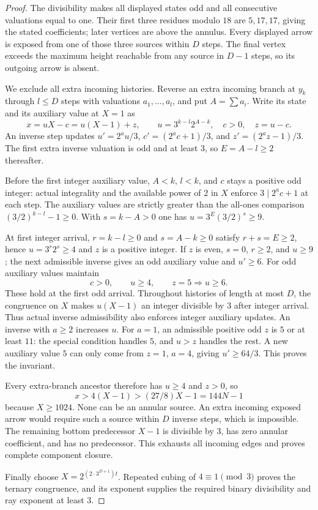 \documentclass[11pt]{article}
\begin{document}
\begin{proof}
The divisibility makes all displayed states odd and all consecutive
valuations equal to one. Their first three residues modulo $18$ are
$5,17,17$, giving the stated coefficients; later vertices are above
the annulus. Every displayed arrow is exposed from one of those three
sources within $D$ steps. The final vertex exceeds the maximum height
reachable from any source in $D-1$ steps, so its outgoing arrow is absent.

We exclude all extra incoming histories. Reverse an extra incoming branch
at $y_k$ through $l\le D$ steps with valuations $a_1,\ldots,a_l$, and put
$A=\sum a_i$. Write its state and its auxiliary value at $X=1$ as
\[
 x=uX-c=u(X-1)+z,\qquad
 u=3^{k-l}2^{A-k},\quad c>0,\quad z=u-c.
\]
An inverse step updates $u'=2^a u/3$, $c'=(2^a c+1)/3$,
and $z'=(2^a z-1)/3$.
The first extra inverse valuation is odd and at least $3$, so
$E=A-l\ge2$ thereafter.

Before the first integer auxiliary value, $A<k$, $l<k$, and $c$ stays
a positive odd integer: actual integrality and the available power of
$2$ in $X$ enforce $3\mid2^a c+1$ at each step. The auxiliary values
are strictly greater than the all-ones comparison
$(3/2)^{k-l}-1\ge0$. With $s=k-A>0$ one has
$u=3^E(3/2)^s\ge9$.

At first integer arrival, $r=k-l\ge0$ and $s=A-k\ge0$ satisfy
$r+s=E\ge2$, hence $u=3^r2^s\ge4$ and $z$ is a positive integer.
If $z$ is even, $s=0$, $r\ge2$, and $u\ge9$; the next admissible
inverse gives an odd auxiliary value and $u'\ge6$.
For odd auxiliary values maintain
\[
 c>0,\qquad u\ge4,\qquad z=5\Longrightarrow u\ge6.
\]
These hold at the first odd arrival. Throughout histories of length
at most $D$, the congruence on $X$ makes $u(X-1)$ an integer divisible
by $3$ after integer arrival. Thus actual inverse admissibility also
enforces integer auxiliary updates. An inverse with $a\ge2$ increases
$u$. For $a=1$, an admissible positive odd $z$ is $5$ or at least
$11$: the special condition handles $5$, and $u>z$ handles the rest.
A new auxiliary value $5$ can only come from $z=1$, $a=4$, giving
$u'\ge64/3$. This proves the invariant.

Every extra-branch ancestor therefore has $u\ge4$ and $z>0$, so
\[
 x>4(X-1)>(27/8)X-1=144N-1
\]
because $X\ge1024$. None can be an annular source. An extra incoming
exposed arrow would require such a source within $D$ inverse steps,
which is impossible. The remaining bottom predecessor $X-1$ is
divisible by $3$, has zero annular coefficient, and has no predecessor.
This exhausts all incoming edges and proves complete component closure.

Finally choose $X=2^{(2\cdot3^{D+1})t}$. Repeated cubing of
$4\equiv1\pmod3$ proves the ternary congruence, and its exponent
supplies the required binary divisibility and ray exponent at least $3$.
\end{proof}
\end{document}
